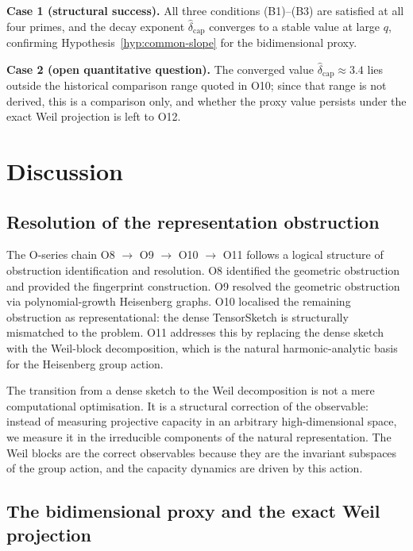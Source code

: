 \documentclass[11pt,a4paper]{article}
\newcommand{\dcap}{\delta_{\mathrm{cap}}}
\begin{document}
    \textbf{Case 1 (structural success).}
    All three conditions (B1)--(B3) are satisfied at all four primes, and the decay exponent
    $\hat\dcap$ converges to a stable value at large $q$, confirming
    Hypothesis~\ref{hyp:common-slope} for the bidimensional proxy.

    \textbf{Case 2 (open quantitative question).}
    The converged value $\hat\dcap \approx 3.4$ lies outside the historical comparison range quoted in O10; since
    that range is not derived, this is a comparison only, and whether the proxy value persists under the exact
    Weil projection is left to O12.

  \section{Discussion}
  \label{sec:discussion}

  \subsection{Resolution of the representation obstruction}
    \label{sec:disc-resolution}

    The O-series chain O8 $\to$ O9 $\to$ O10 $\to$ O11 follows a logical structure of
    obstruction identification and resolution.
    O8 identified the geometric obstruction and provided the fingerprint construction.
    O9 resolved the geometric obstruction via polynomial-growth Heisenberg graphs.
    O10 localised the remaining obstruction as representational: the dense TensorSketch is
    structurally mismatched to the problem.
    O11 addresses this by replacing the dense sketch with the Weil-block decomposition, which
    is the natural harmonic-analytic basis for the Heisenberg group action.

    The transition from a dense sketch to the Weil decomposition is not a mere computational
    optimisation.
    It is a structural correction of the observable: instead of measuring projective capacity
    in an arbitrary high-dimensional space, we measure it in the irreducible components of the
    natural representation.
    The Weil blocks are the correct observables because they are the invariant subspaces of
    the group action, and the capacity dynamics are driven by this action.

  \subsection{The bidimensional proxy and the exact Weil projection}
    \label{sec:proxy-discussion}
\end{document}

